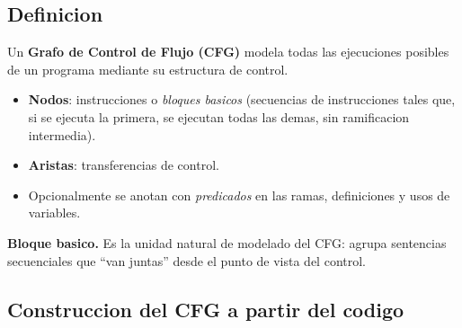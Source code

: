 \documentclass[12pt,a4paper]{article}
\begin{document}
\subsection{Definicion}

\begin{definicionbox}
Un \textbf{Grafo de Control de Flujo (CFG)} modela todas las ejecuciones posibles de un programa
mediante su estructura de control.
\begin{itemize}
  \item \textbf{Nodos}: instrucciones o \emph{bloques basicos} (secuencias de instrucciones tales
  que, si se ejecuta la primera, se ejecutan todas las demas, sin ramificacion intermedia).
  \item \textbf{Aristas}: transferencias de control.
  \item Opcionalmente se anotan con \emph{predicados} en las ramas, definiciones y usos de
  variables.
\end{itemize}
\end{definicionbox}

\textbf{Bloque basico.} Es la unidad natural de modelado del CFG: agrupa sentencias secuenciales
que ``van juntas'' desde el punto de vista del control.

\subsection{Construccion del CFG a partir del codigo}
\end{document}
